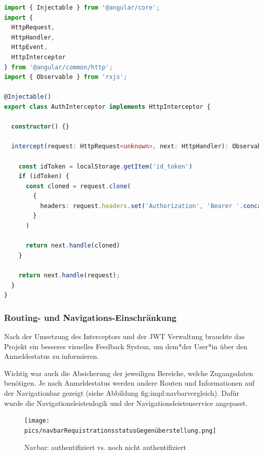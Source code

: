 \begin{lstlisting}[caption=auth.interceptor.ts - add JWT to Request Header,label=lst:impl:sign:JWTInterceptor,language=TypeScript]
import { Injectable } from '@angular/core';
import {
  HttpRequest,
  HttpHandler,
  HttpEvent,
  HttpInterceptor
} from '@angular/common/http';
import { Observable } from 'rxjs';

@Injectable()
export class AuthInterceptor implements HttpInterceptor {

  constructor() {}

  intercept(request: HttpRequest<unknown>, next: HttpHandler): Observable<HttpEvent<unknown>> {

    const idToken = localStorage.getItem('id_token')
    if (idToken) {
      const cloned = request.clone(
        {
          headers: request.headers.set('Authorization', 'Bearer '.concat(idToken))
        }
      )

      return next.handle(cloned)
    }

    return next.handle(request);
  }
}
\end{lstlisting}

\subsubsection{Routing- und Navigations-Einschränkung}
Nach der Umsetzung des Interceptors und der JWT Verwaltung brauchte das Projekt ein besseres visuelles Feedback System, um dem*der User*in über den Anmeldestatus zu informieren.

Wichtig war auch die Absicherung der jeweiligen Bereiche, welche Zugangsdaten benötigen. Je nach Anmeldestatus werden andere Routen und Informationen auf der Navigationbar gezeigt (siehe Abbildung {fig:impl:navbarvergleich}). Dafür wurde die Navigationsleistenlogik und der Navigationsleistenservice angepasst.

\begin{figure}
  \centering
  \texttt{[image: pics/navbarRequistrationsstatusGegenüberstellung.png]}
  \caption{Navbar: authentifiziert vs. noch nicht authentifiziert}
  \label{fig:impl:navbarvergleich}
\end{figure}


